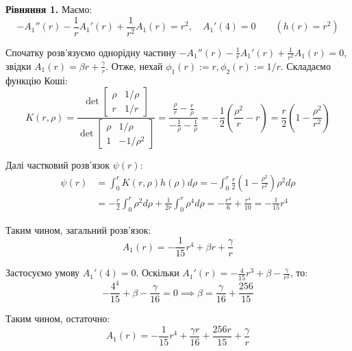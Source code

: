\documentclass{hw_template}
\begin{document}
\textbf{Рівняння 1.} Маємо:
\begin{equation*}
    -A_1''(r)-\frac{1}{r}A_1'(r)+\frac{1}{r^2}A_1(r)=r^2, \quad A_1'(4)=0 \quad \quad (h(r)=r^2)
\end{equation*}

Спочатку розв'язуємо однорідну частину $-A_1''(r)-\frac{1}{r}A_1'(r)+\frac{1}{r^2}A_1(r)=0$, звідки 
$A_1(r) = \beta r + \frac{\gamma}{r}$. Отже, нехай $\phi_1(r) := r, \phi_2(r) := 1/r$. Складаємо функцію Коші:
\begin{equation*}
    K(r,\rho) = \frac{\det \begin{bmatrix}
        \rho & 1/\rho \\
        r & 1/r
    \end{bmatrix}}{\det \begin{bmatrix}
        \rho & 1/\rho \\
        1 & -1/\rho^2
    \end{bmatrix}} = \frac{\frac{\rho}{r} - \frac{r}{\rho}}{-\frac{1}{\rho} - \frac{1}{\rho}} = -\frac{1}{2}\left(\frac{\rho^2}{r} -r\right) = \frac{r}{2}\left(1 - \frac{\rho^2}{r^2}\right)
\end{equation*}

Далі частковий розв'язок $\psi(r)$:
\begin{align*}
    \psi(r) &= \int_0^r K(r,\rho)h(\rho)d\rho = -\int_0^r \frac{r}{2}\left(1 - \frac{\rho^2}{r^2}\right)\rho^2 d\rho \\
    &= -\frac{r}{2}\int_0^r \rho^2 d\rho + \frac{1}{2r}\int_0^r \rho^4 d\rho = -\frac{r^4}{6} + \frac{r^4}{10} = -\frac{1}{15}r^4
\end{align*}

Таким чином, загальний розв'язок:
\begin{equation*}
    A_1(r) = -\frac{1}{15}r^4 + \beta r + \frac{\gamma}{r}
\end{equation*}

Застосуємо умову $A_1'(4)=0$. Оскільки $A_1'(r) = -\frac{4}{15}r^3 + \beta - \frac{\gamma}{r^2}$, то:
\begin{equation*}
    -\frac{4^4}{15} + \beta - \frac{\gamma}{16} = 0 \implies \beta = \frac{\gamma}{16} + \frac{256}{15}
\end{equation*}

Таким чином, остаточно:
\begin{equation*}
    A_1(r) = -\frac{1}{15}r^4 + \frac{\gamma r}{16} + \frac{256 r}{15} + \frac{\gamma}{r}
\end{equation*}
\end{document}
